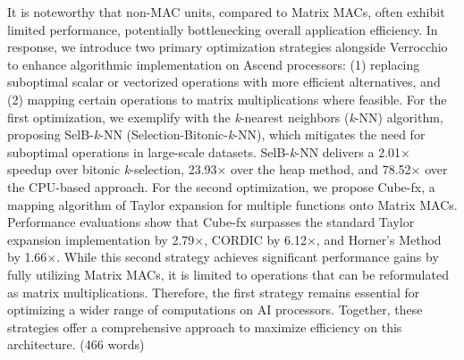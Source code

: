 It is noteworthy that non-MAC units, compared to Matrix MACs, often exhibit limited performance, potentially bottlenecking overall application efficiency. In response, we introduce two primary optimization strategies alongside Verrocchio to enhance algorithmic implementation on Ascend processors: (1) replacing suboptimal scalar or vectorized operations with more efficient alternatives, and (2) mapping certain operations to matrix multiplications where feasible. For the first optimization, we exemplify with the \textit{k}-nearest neighbors (\textit{k}-NN) algorithm, proposing SelB-\textit{k}-NN (Selection-Bitonic-\textit{k}-NN), which mitigates the need for suboptimal operations in large-scale datasets. SelB-\textit{k}-NN delivers a 2.01$\times$ speedup over bitonic \textit{k}-selection, 23.93$\times$ over the heap method, and 78.52$\times$ over the CPU-based approach. For the second optimization, we propose Cube-fx, a mapping algorithm of Taylor expansion for multiple functions onto Matrix MACs. Performance evaluations show that Cube-fx surpasses the standard Taylor expansion implementation by 2.79$\times$, CORDIC by 6.12$\times$, and Horner's Method by 1.66$\times$. While this second strategy achieves significant performance gains by fully utilizing Matrix MACs, it is limited to operations that can be reformulated as matrix multiplications. Therefore, the first strategy remains essential for optimizing a wider range of computations on AI processors. Together, these strategies offer a comprehensive approach to maximize efficiency on this architecture. (466 words)